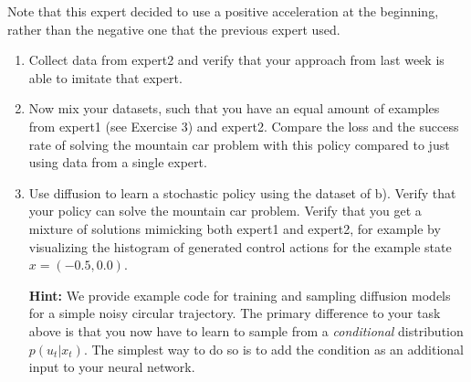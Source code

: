 Note that this expert decided to use a positive acceleration at the beginning, rather than the negative one that the previous expert used.

\begin{enumerate}
  \item Collect data from expert2 and verify that your approach from last week is able to imitate that expert.
  
  \item Now mix your datasets, such that you have an equal amount of examples from expert1 (see Exercise 3) and expert2. Compare the loss and the success rate of solving the mountain car problem with this policy compared to just using data from a single expert.

  \item Use diffusion to learn a stochastic policy using the dataset of b). Verify that your policy can solve the mountain car problem. Verify that you get a mixture of solutions mimicking both expert1 and expert2, for example by visualizing the histogram of generated control actions for the example state $x=(-0.5,0.0)$.
  
  \textbf{Hint:} We provide example code for training and sampling diffusion models for a simple noisy circular trajectory. The primary difference to your task above is that you now have to learn to sample from a \emph{conditional} distribution $p(u_t|x_t)$. The simplest way to do so is to add the condition as an additional input to your neural network.
  
\end{enumerate}



\exerfoot
